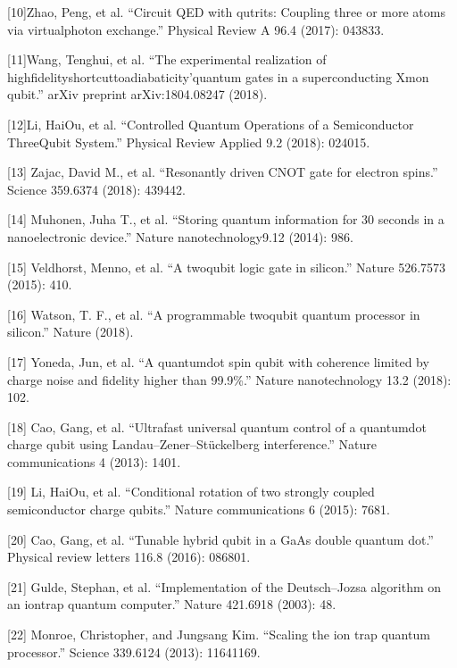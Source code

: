 \documentclass[a4paper,11pt,english]{sphinxmanual}
\begin{document}
\sphinxAtStartPar
{[}10{]}Zhao, Peng, et al. “Circuit QED with qutrits: Coupling three or more atoms via virtual\sphinxhyphen{}photon exchange.” Physical Review A 96.4 (2017): 043833.

\sphinxAtStartPar
{[}11{]}Wang, Tenghui, et al. “The experimental realization of high\sphinxhyphen{}fidelityshortcut\sphinxhyphen{}to\sphinxhyphen{}adiabaticity’quantum gates in a superconducting Xmon qubit.” arXiv preprint arXiv:1804.08247 (2018).

\sphinxAtStartPar
{[}12{]}Li, Hai\sphinxhyphen{}Ou, et al. “Controlled Quantum Operations of a Semiconductor Three\sphinxhyphen{}Qubit System.” Physical Review Applied 9.2 (2018): 024015.

\sphinxAtStartPar
{[}13{]} Zajac, David M., et al. “Resonantly driven CNOT gate for electron spins.” Science 359.6374 (2018): 439\sphinxhyphen{}442.

\sphinxAtStartPar
{[}14{]} Muhonen, Juha T., et al. “Storing quantum information for 30 seconds in a nanoelectronic device.” Nature nanotechnology9.12 (2014): 986.

\sphinxAtStartPar
{[}15{]} Veldhorst, Menno, et al. “A two\sphinxhyphen{}qubit logic gate in silicon.” Nature 526.7573 (2015): 410.

\sphinxAtStartPar
{[}16{]} Watson, T. F., et al. “A programmable two\sphinxhyphen{}qubit quantum processor in silicon.” Nature (2018).

\sphinxAtStartPar
{[}17{]} Yoneda, Jun, et al. “A quantum\sphinxhyphen{}dot spin qubit with coherence limited by charge noise and fidelity higher than 99.9\%.” Nature nanotechnology 13.2 (2018): 102.

\sphinxAtStartPar
{[}18{]} Cao, Gang, et al. “Ultrafast universal quantum control of a quantum\sphinxhyphen{}dot charge qubit using Landau–Zener–Stückelberg interference.” Nature communications 4 (2013): 1401.

\sphinxAtStartPar
{[}19{]} Li, Hai\sphinxhyphen{}Ou, et al. “Conditional rotation of two strongly coupled semiconductor charge qubits.” Nature communications 6 (2015): 7681.

\sphinxAtStartPar
{[}20{]} Cao, Gang, et al. “Tunable hybrid qubit in a GaAs double quantum dot.” Physical review letters 116.8 (2016): 086801.

\sphinxAtStartPar
{[}21{]} Gulde, Stephan, et al. “Implementation of the Deutsch–Jozsa algorithm on an ion\sphinxhyphen{}trap quantum computer.” Nature 421.6918 (2003): 48.

\sphinxAtStartPar
{[}22{]} Monroe, Christopher, and Jungsang Kim. “Scaling the ion trap quantum processor.” Science 339.6124 (2013): 1164\sphinxhyphen{}1169.
\end{document}
